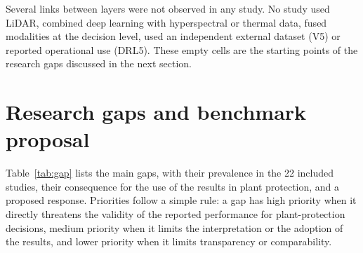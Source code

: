 \documentclass[preprint,12pt]{elsarticle}
\begin{document}
Several links between layers were not observed in any study. No study used LiDAR, combined deep learning with hyperspectral or thermal data, fused modalities at the decision level, used an independent external dataset (V5) or reported operational use (DRL5). These empty cells are the starting points of the research gaps discussed in the next section.

\section{Research gaps and benchmark proposal}\label{sec:gaps}
Table~\ref{tab:gap} lists the main gaps, with their prevalence in the 22 included studies, their consequence for the use of the results in plant protection, and a proposed response. Priorities follow a simple rule: a gap has high priority when it directly threatens the validity of the reported performance for plant-protection decisions, medium priority when it limits the interpretation or the adoption of the results, and lower priority when it limits transparency or comparability.
\end{document}
